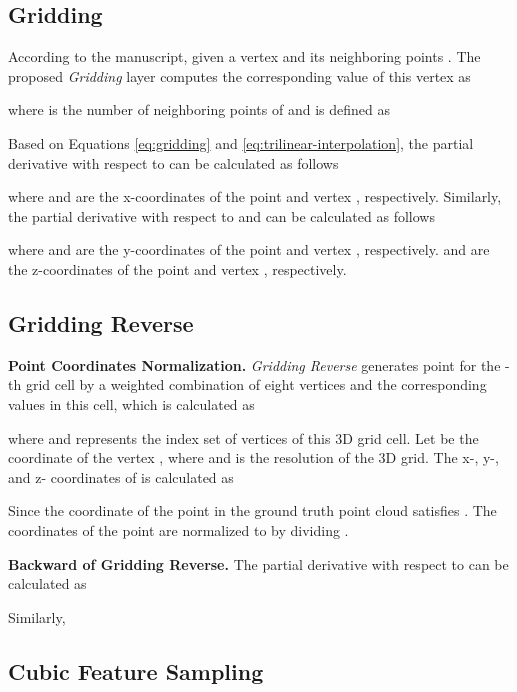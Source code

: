 \documentclass[runningheads]{llncs}
\begin{document}
\subsection{Gridding}

According to the manuscript, given a vertex  and its neighboring points . 
The proposed {\it Gridding} layer computes the corresponding value  of this vertex  as


where  is the number of neighboring points of  and  is defined as


Based on Equations \ref{eq:gridding} and \ref{eq:trilinear-interpolation}, the partial derivative with respect to  can be calculated as follows


where  and  are the x-coordinates of the point  and vertex , respectively.
Similarly, the partial derivative with respect to  and  can be calculated as follows




where  and  are the y-coordinates of the point  and vertex , respectively.
 and  are the z-coordinates of the point  and vertex , respectively.

\subsection{Gridding Reverse}

\noindent \textbf{Point Coordinates Normalization.}
{\it Gridding Reverse} generates point  for the -th grid cell by a weighted combination of eight vertices  and the corresponding values  in this cell, which is calculated as


where  and  represents the index set of vertices of this 3D grid cell.
Let  be the coordinate of the vertex , where  and  is the resolution of the 3D grid.
The x-, y-, and z- coordinates of  is calculated as






Since the coordinate  of the point in the ground truth point cloud satisfies .
The coordinates of the point  are normalized to  by dividing . 

\noindent \textbf{Backward of Gridding Reverse.}
The partial derivative with respect to  can be calculated as


Similarly,




\subsection{Cubic Feature Sampling}
\end{document}
